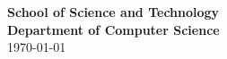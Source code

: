 \begin{titlepage}
\begin{fullwidth}
\begin{center}
	    \vspace{1cm}

		\textbf{School of Science and Technology}\\
        \textbf{Department of Computer Science}\\
        
        \vfill
        \monthyeardate\today
        
    \end{center}
\end{fullwidth}
\end{titlepage}